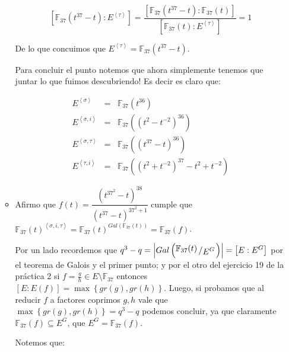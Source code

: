 \documentclass[11pt]{article}
\newcommand{\abs}[1]{\left\lvert#1\right\rvert}
\newcommand{\ip}[1]{\left\langle#1\right\rangle}
\newcommand{\quotient}[2]{{\raisebox{.2em}{$#1$}\left/\raisebox{-.2em}{$#2$}\right.}}
\numberwithin{theorem}{subsection}
\begin{document}
\begin{enumerate}
\begin{itemize}
	\begin{equation*}
	\left[\mathbb{F}_{37}(t^{37} - t): E^{\ip{\tau}}\right] = \dfrac{\left[\mathbb{F}_{37}(t^{37} - t): \mathbb{F}_{37}(t)\right]}{\left[\mathbb{F}_{37}(t): E^{\ip{\tau}}\right]} = 1
	\end{equation*}
	
	De lo que concuimos que $E^{\ip{\tau}} = \mathbb{F}_{37}(t^{37} - t)$.
	
	Para concluir el punto notemos que ahora simplemente tenemos que juntar lo que fuimos descubriendo! Es decir es claro que:
	
	\begin{equation*}
		\begin{array}{rcl}
			E^{\ip{\sigma}} & = & \mathbb{F}_{37}\left(t^{36}\right) \\
			E^{\ip{\sigma, i}} & = & \mathbb{F}_{37}\left(\left(t^2 - t^{-2}\right)^{36}\right) \\
			E^{\ip{\sigma, \tau}} & = & \mathbb{F}_{37}\left(\left(t^{37} - t\right)^{36}\right) \\
			E^{\ip{\tau, i}} & = & \mathbb{F}_{37}\left(\left(t^{2} + t^{-2} \right)^{37} - t^{2} + t^{-2} \right)
		\end{array}
	\end{equation*}
	
	\item Afirmo que $f(t) = \dfrac{\left(t^{37^2} - t\right)^{38}}{\left(t^{37} - t\right)^{37^2 + 1}}$ cumple que $\mathbb{F}_{37}(t)^{\ip{\sigma, i , \tau}} = \mathbb{F}_{37}(t)^{Gal(\mathbb{F}_{37}(t))} = \mathbb{F}_{37}(f)$.
	
	Por un lado recordemos que $q^3 - q = \abs{Gal \left(\quotient{\mathbb{F}_{37}(t)}{E^{G}}\right)} = \left[E: E^{G}\right]$ por el teorema de Galois y el primer punto; y por el otro del ejercicio 19 de la pr\'actica 2 si $f = \frac{g}{h} \in E \setminus \mathbb{F}_{37}$ entonces $\left[E: E(f)\right] = \max \left\lbrace gr(g), gr(h) \right\rbrace$. Luego, si probamos que al reducir $f$ a factores coprimos $g,h$ vale que $\max \left\lbrace gr(g), gr(h) \right\rbrace= q^3 - q$ podemos concluir, ya que claramente $\mathbb{F}_{37}(f) \subseteq E^G$, que $E^G = \mathbb{F}_{37}(f)$.
	
	Notemos que:
	

\end{itemize}
\end{enumerate}
\end{document}
